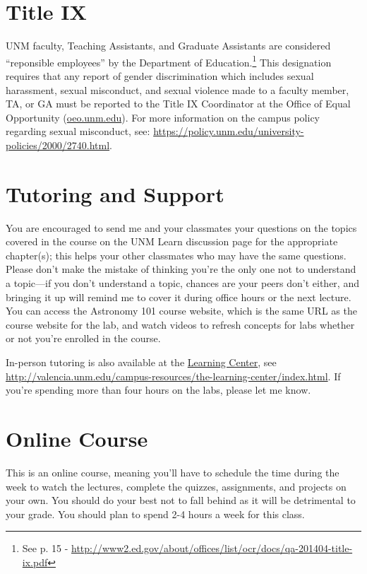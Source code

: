 \documentclass[12pt]{article}
\begin{document}
\section*{Title IX}
UNM faculty, Teaching Assistants, and Graduate Assistants are considered ``reponsible employees'' by the Department of Education.\footnote{See p. 15 - \url{http://www2.ed.gov/about/offices/list/ocr/docs/qa-201404-title-ix.pdf}}  This designation requires that any report of gender discrimination which includes sexual harassment, sexual misconduct, and sexual violence made to a faculty member, TA, or GA must be reported to the Title IX Coordinator at the Office of Equal Opportunity (\url{oeo.unm.edu}).  For more information on the campus policy regarding sexual misconduct, see: \url{https://policy.unm.edu/university-policies/2000/2740.html}.


\section*{Tutoring and Support}
You are encouraged to send me and your classmates your questions on the topics covered in the course on the UNM Learn discussion page for the appropriate chapter(s); this helps your other classmates who may have the same questions.  Please don't make the mistake of thinking you're the only one not to understand a topic---if you don't understand a topic, chances are your peers don't either, and bringing it up will remind me to cover it during office hours or the next lecture.  You can access the Astronomy 101 course website, which is the same URL as the course website for the lab, and watch videos to refresh concepts for labs whether or not you're enrolled in the course.

In-person tutoring is also available at the \href{http://valencia.unm.edu/campus-resources/the-learning-center/index.html}{Learning Center}, see \url{http://valencia.unm.edu/campus-resources/the-learning-center/index.html}.  If you're spending more than four hours on the labs, please let me know.

\section*{Online Course}
This is an online course, meaning you'll have to schedule the time during the week to watch the lectures, complete the quizzes, assignments, and projects on your own.  You should do your best not to fall behind as it will be detrimental to your grade.  You should plan to spend 2-4 hours a week for this class.
\end{document}

